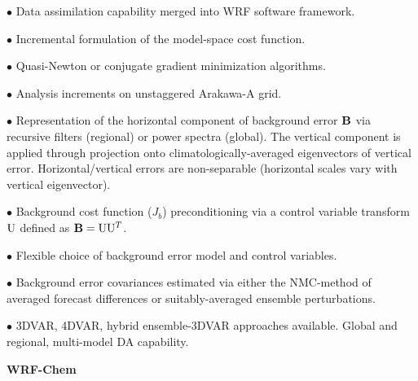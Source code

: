 \begin{description}
\setlength{\itemsep}{-5pt}
\item{$\bullet$} Data assimilation capability merged into WRF software framework.
%
\item{$\bullet$} Incremental formulation of the model-space cost function.
%
\item{$\bullet$} Quasi-Newton or conjugate gradient minimization algorithms.
%
\item{$\bullet$} Analysis increments on unstaggered Arakawa-A grid.
%
\item{$\bullet$} Representation of the horizontal component of background 
error ${\bf B}$ via recursive filters (regional) or power spectra (global). The
vertical component is applied through projection onto climatologically-averaged 
eigenvectors of vertical error. Horizontal/vertical errors are
non-separable (horizontal scales vary with vertical eigenvector).
%
\item{$\bullet$}  Background cost function ($J_b$) preconditioning 
via a control variable transform ${\rm U}$ defined as ${\bf B}={\rm U} {\rm U}^T$.
%
\item{$\bullet$} Flexible choice of background error model and control variables.
%
\item{$\bullet$} Background error covariances estimated via either the
NMC-method of averaged forecast differences or suitably-averaged
ensemble perturbations.
%
\item{$\bullet$} 3DVAR, 4DVAR, hybrid ensemble-3DVAR approaches available. 
Global and regional, multi-model DA capability.
%
\end{description}

\vskip 12pt
{\noindent\bf WRF-Chem}
\vskip 12pt

